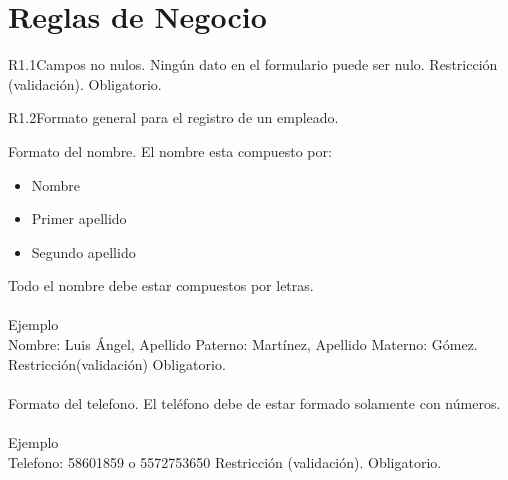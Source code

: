 
\section{Reglas de Negocio}

\begin{BussinesRule}{R1.1}{Campos no nulos.} 
	\BRitem[Descripción:] Ningún dato en el formulario puede ser nulo.
	\BRitem[Tipo:] Restricción (validación).
	\BRitem[Nivel:] Obligatorio.
\end{BussinesRule}


\begin{BussinesRule}{R1.2}{Formato general para el registro de un empleado.} 

	\BRitem[Nombre:] Formato del nombre.
	\BRitem[Descripción:] El nombre esta compuesto por:
		\begin{itemize} 
			\item Nombre
			\item Primer apellido
			\item Segundo apellido 
		\end{itemize}
		Todo el nombre debe estar compuestos por letras.\\\\
	Ejemplo \\
	Nombre: Luis Ángel, Apellido Paterno: Martínez, Apellido Materno: Gómez.
	\BRitem[Tipo:] Restricción(validación)
	\BRitem[Nivel:] Obligatorio.\\\\

	\BRitem[Telefono:] Formato del telefono.
	\BRitem[Descripción:] El teléfono debe de estar formado solamente con números.\\\\
	Ejemplo \\
	Telefono: 58601859 o 5572753650
	\BRitem[Tipo:] Restricción (validación).
	\BRitem[Nivel:] Obligatorio.\\\\


\end{BussinesRule}

